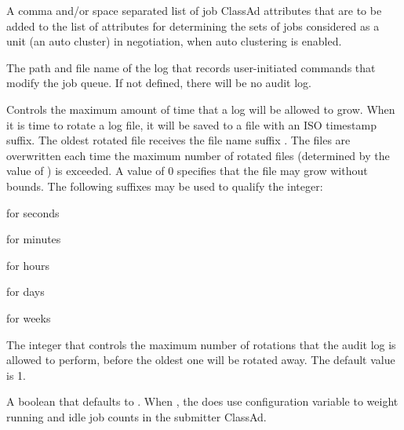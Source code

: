 \begin{description}
\label{param:SignificantAttributes}
\item[\Macro{SIGNIFICANT\_ATTRIBUTES}]
  A comma and/or space separated list of job ClassAd attributes that
  are to be added to the list of attributes for determining
  the sets of jobs considered as a unit (an auto cluster) in negotiation,
  when auto clustering is enabled.

\label{param:ScheddAuditLog}
\item[\Macro{SCHEDD\_AUDIT\_LOG}]
  The path and file name of the  log that records
  user-initiated commands that modify the job queue.
  If not defined, there will be no  audit log.

\label{param:MaxScheddAuditLog}
\item[\Macro{MAX\_SCHEDD\_AUDIT\_LOG}]
  Controls the maximum amount of time that a log will be allowed to grow. 
  When it is time to rotate a log file, 
  it will be saved to a file with an ISO timestamp suffix. 
  The oldest rotated file receives the file name suffix . 
  The  files are overwritten each time the maximum number of 
  rotated files 
  (determined by the value of )
  is exceeded. 
  A value of 0 specifies that the file may grow without bounds.
  The following suffixes may be used to qualify the integer: 
\begin{description}
  \item{ for seconds}
  \item{ for minutes}
  \item{ for hours}
  \item{ for days}
  \item{ for weeks}
\end{description}

\label{param:MaxNumScheddAuditLog}
\item[\Macro{MAX\_NUM\_SCHEDD\_AUDIT\_LOG}]
  The integer that controls the maximum number of rotations that
  the  audit log is allowed to perform,
  before the oldest one will be rotated away. The default value is 1. 

\label{param:ScheddUseSlotWeight}
\item[\Macro{SCHEDD\_USE\_SLOT\_WEIGHT}]
  A boolean that defaults to . When , 
  the  does use configuration variable  
  to weight running and idle job counts in the submitter ClassAd.

\end{description}
